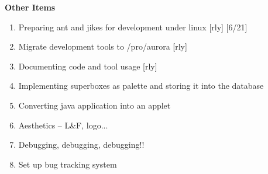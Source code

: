 \documentclass[10pt]{article}
\begin{document}
\vspace{.5in}

\Large \textbf{Other Items} \normalsize
\begin{enumerate}
\item Preparing ant and jikes for development under linux [rly] [6/21]
\item Migrate development tools to /pro/aurora [rly]
\item Documenting code and tool usage [rly]
\item Implementing superboxes as palette and storing it into the database
\item Converting java application into an applet
\item Aesthetics -- L\&F, logo...
\item Debugging, debugging, debugging!!
\item Set up bug tracking system
\end{enumerate}
\end{document}
